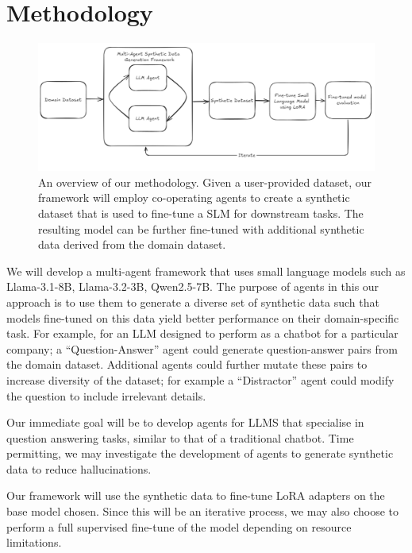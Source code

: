\section{Methodology}

\begin{figure}[h]
  \centering
  \includegraphics[width=1\textwidth]{methodology.jpg}
  \caption{An overview of our methodology. Given a user-provided dataset, our
framework will employ co-operating agents to create a synthetic dataset that is
used to fine-tune a SLM for downstream tasks. The resulting model can be further
fine-tuned with additional synthetic data derived from the domain dataset.}
\end{figure}

We will develop a multi-agent
framework that uses small language models such as Llama-3.1-8B, Llama-3.2-3B,
Qwen2.5-7B.
The purpose of agents in this our approach is to use them to generate a diverse
set of synthetic data such that models fine-tuned on this data yield better
performance on their domain-specific task. For example, for an LLM designed to
perform as a chatbot for a particular company; a ``Question-Answer'' agent could
generate question-answer pairs from the domain dataset. Additional agents could
further mutate these pairs to increase diversity of the dataset; for example a
``Distractor'' agent could modify the question to include irrelevant details.

Our immediate goal will be to develop agents for LLMS that specialise in
question answering tasks, similar to that of a traditional chatbot. Time
permitting, we may investigate the development of agents to generate synthetic
data to reduce hallucinations.

Our framework will use the synthetic data to fine-tune LoRA adapters on the base
model chosen. Since this will be an iterative process, we may also choose to
perform a full supervised fine-tune of the model depending on resource
limitations.

